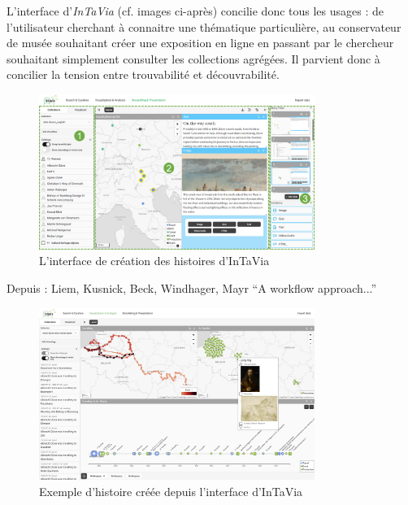 L’interface d’\textit{InTaVia} (cf. images ci-après) concilie donc tous les usages : de l’utilisateur cherchant à connaitre une thématique particulière, au conservateur de musée souhaitant créer une exposition en ligne en passant par le chercheur souhaitant simplement consulter les collections agrégées. Il parvient donc à concilier la tension entre trouvabilité et découvrabilité.


\begin{figure}[h!]
	\centering
	\includegraphics[width=0.8\textwidth]{images/image19.png}
	\caption{L’interface de création des histoires d'InTaVia}
	\label{fig:image19}
\end{figure}

\begin{center}
	Depuis : Liem, Kusnick, Beck, Windhager, Mayr \enquote{A workflow approach...}
\end{center}




\begin{figure}[h!]
	\centering
	\includegraphics[width=0.8\textwidth]{images/image20.png}
	\caption{Exemple d'histoire créée depuis l'interface d'InTaVia}
	\label{fig:image20}
\end{figure}


